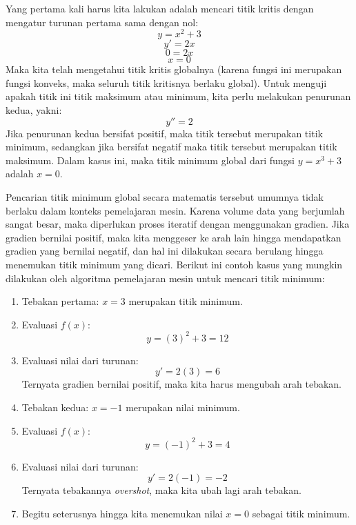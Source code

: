 Yang pertama kali harus kita lakukan adalah mencari titik kritis dengan mengatur turunan pertama sama dengan nol:
\begin{equation*}
    y = x^{2} + 3
\end{equation*}
\begin{equation*}
    y' = 2x
\end{equation*}
\begin{equation*}
    0 = 2x
\end{equation*}
\begin{equation*}
    x = 0
\end{equation*}
Maka kita telah mengetahui titik kritis globalnya (karena fungsi ini merupakan fungsi konveks, maka seluruh titik kritisnya berlaku global). Untuk menguji apakah titik ini titik maksimum atau minimum, kita perlu melakukan penurunan kedua, yakni:
\begin{equation*}
    y'' = 2
\end{equation*}
Jika penurunan kedua bersifat positif, maka titik tersebut merupakan titik minimum, sedangkan jika bersifat negatif maka titik tersebut merupakan titik maksimum. Dalam kasus ini, maka titik minimum global dari fungsi $y = x^{3} + 3$ adalah $x = 0$.

Pencarian titik minimum global secara matematis tersebut umumnya tidak berlaku dalam konteks pemelajaran mesin. Karena volume data yang berjumlah sangat besar, maka diperlukan proses iteratif dengan menggunakan gradien. Jika gradien bernilai positif, maka kita menggeser ke arah lain hingga mendapatkan gradien yang bernilai negatif, dan hal ini dilakukan secara berulang hingga menemukan titik minimum yang dicari. Berikut ini contoh kasus yang mungkin dilakukan oleh algoritma pemelajaran mesin untuk mencari titik minimum:

\begin{enumerate}
    \item Tebakan pertama: $x=3$ merupakan titik minimum.
    \item Evaluasi $f(x)$:
    \begin{equation*}
        y = (3)^{2} + 3 = 12
    \end{equation*}
    \item Evaluasi nilai dari turunan:
    \begin{equation*}
        y' = 2(3) = 6
    \end{equation*}
    Ternyata gradien bernilai positif, maka kita harus mengubah arah tebakan.
    \item Tebakan kedua: $x = -1$ merupakan nilai minimum.
    \item Evaluasi $f(x)$:
        \begin{equation*}
           y = (-1)^{2} + 3 = 4
        \end{equation*}
    \item Evaluasi nilai dari turunan:
    \begin{equation*}
        y' = 2(-1) = -2
    \end{equation*}
    Ternyata tebakannya \textit{overshot}, maka kita ubah lagi arah tebakan.
    \item Begitu seterusnya hingga kita menemukan nilai $x = 0$ sebagai titik minimum.
\end{enumerate}


